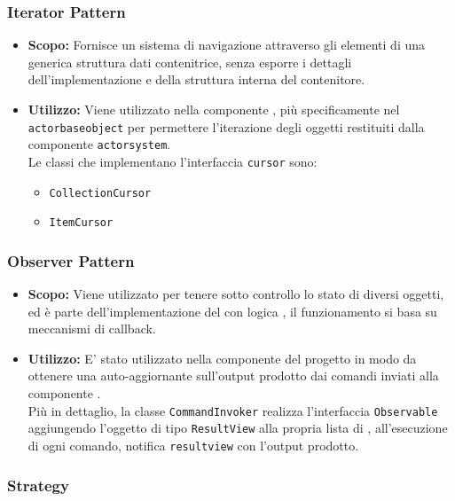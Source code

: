 \documentclass{scalatekids-article}
\begin{document}
\subsubsection{Iterator Pattern}

\begin{itemize}
\item \textbf{Scopo:} Fornisce un sistema di navigazione attraverso gli elementi di una generica struttura dati contenitrice,
  senza esporre i dettagli dell'implementazione e della struttura interna del contenitore.
\item \textbf{Utilizzo:} Viene utilizzato nella componente , più specificamente nel  \verb=actorbaseobject=
  per permettere l'iterazione degli oggetti restituiti dalla componente \verb=actorsystem=.\\
  Le classi che implementano l'interfaccia \verb=cursor= sono:
  \begin{itemize}
  \item \verb=CollectionCursor=
  \item \verb=ItemCursor=
  \end{itemize}
\end{itemize}

\subsubsection{Observer Pattern}

\label{sec:ObserverPattern}

\begin{itemize}
\item \textbf{Scopo:} Viene utilizzato per tenere sotto controllo lo stato di diversi oggetti, ed è parte dell'implementazione
  del   con logica , il funzionamento si basa su meccanismi di callback.
\item \textbf{Utilizzo:} E' stato utilizzato nella componente  del progetto in modo da ottenere una 
  auto-aggiornante sull'output prodotto dai comandi inviati alla componente .\\
  Più in dettaglio, la classe \verb=CommandInvoker= realizza l'interfaccia \verb=Observable= aggiungendo l'oggetto di tipo
  \verb=ResultView= alla propria lista di , all'esecuzione di ogni comando, notifica \verb=resultview=
  con l'output prodotto.
\end{itemize}

\subsubsection{Strategy}
\end{document}

